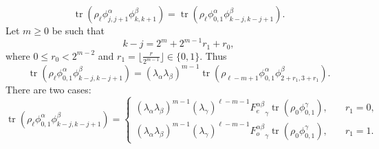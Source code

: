 \documentclass[prl,twocolumn,lengthcheck,superscriptaddress]{revtex4-1}
\newcommand{\tr}{\operatorname{tr}}
\theoremstyle{definition}
\theoremstyle{remark}
\begin{document}
\begin{equation}
	\tr(\rho_{\ell}\phi_{j,j+1}^{\alpha}\phi_{k,k+1}^{\beta}) = \tr(\rho_{\ell}\phi_{0,1}^{\alpha}\phi_{k-j,k-j+1}^{\beta}).
\end{equation}
Let $m\ge 0$ be such that 
\begin{equation}
	k-j = 2^m + 2^{m-1}r_1 + r_0,
\end{equation}
where $0 \le r_0 < 2^{m-2}$ and $r_1 = \lfloor \frac{r}{2^{m-1}}\rfloor \in  \{0,1\}$.
Thus
\begin{equation}
	\tr(\rho_{\ell}\phi_{0,1}^{\alpha}\phi_{k-j,k-j+1}^{\beta}) = (\lambda_\alpha\lambda_\beta)^{m-1}\tr(\rho_{\ell-m+1} \phi_{0,1}^\alpha \phi_{2 + r_1, 3+r_1}^\beta).
\end{equation}
There are two cases:
\begin{equation}
	\tr(\rho_{\ell}\phi_{0,1}^{\alpha}\phi_{k-j,k-j+1}^{\beta}) = \begin{cases} (\lambda_\alpha\lambda_\beta)^{m-1}(\lambda_\gamma)^{\ell-m-1}{F_e^{\alpha\beta}}_\gamma\tr(\rho_{0} \phi_{0,1}^\gamma), &\quad \text{$r_1=0$,} \\ 
	(\lambda_\alpha\lambda_\beta)^{m-1}(\lambda_\gamma)^{\ell-m-1}{F_o^{\alpha\beta}}_\gamma\tr(\rho_{0} \phi_{0,1}^\gamma), &\quad \text{$r_1=1$.}\end{cases}
\end{equation}

\end{document}
